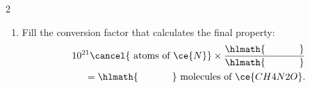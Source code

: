 \documentclass[main.tex]{subfiles}
\begin{document}
\begin{multicols*}{2}
\begin{enumerate}
\item Fill the conversion factor that calculates the final property:
 \begin{equation*}\begin{split}
10^{21}\cancel{\text{ atoms of }\ce{N}} \times \dfrac{\hlmath{\hspace{35pt}}}{\hlmath{\hspace{35pt}}}\\
=\hlmath{\hspace{35pt}}\text{ molecules of }\ce{CH4N2O}.
\end{split}\end{equation*}

%
%
%

\end{enumerate}
\end{multicols*}
\end{document}
